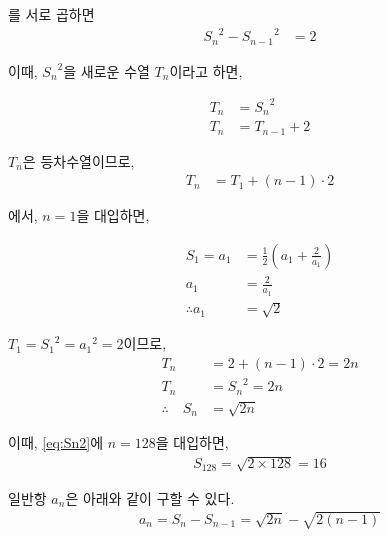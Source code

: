 \documentclass[a4paper,12pt]{article}
\begin{document}
를 서로 곱하면
\begin{align}
    {S_n}^2 - {S_{n-1}}^2 &= 2 \label{eq:diff_square}
\end{align}

\newpage
이때, ${S_n}^2$을 새로운 수열 ${T_n}$이라고 하면,

\begin{align}
    T_n &= {S_n}^2 \nonumber \\
    T_n &= T_{n-1} + 2 \label{eq:Tn}
\end{align}

$T_n$은 등차수열이므로,
\begin{align}
    T_n &= T_1 + (n-1) \cdot 2 \label{eq:Tn2}
\end{align}


 에서, $n=1$을 대입하면,

\begin{align}
    S_1 = a_1 &= \frac{1}{2}\left(a_1 + \frac{2}{a_1}\right) \nonumber \\
        {a_1} &= \frac{2}{a_1} \nonumber \\
        \therefore a_1 &= \sqrt{2} \label{eq:a_1}
\end{align}

$T_1 = {S_1}^2 = {a_1}^2 = 2$이므로,
\begin{align}
    T_n &= 2 + (n-1) \cdot 2 = 2n \nonumber \\
    T_n &= {S_n}^2 = 2n \nonumber \\
    \therefore \quad S_n &= \sqrt{2n} \label{eq:Sn2}
\end{align}


이때, \cref{eq:Sn2}에 $n=128$을 대입하면,
\begin{align*}
    S_{128} = \sqrt{2\times 128} =16
\end{align*}

일반항 $a_n$은 아래와 같이 구할 수 있다.
\begin{align*}
    a_n = S_n - S_{n-1} = \sqrt{2n} - \sqrt{2(n-1)}
\end{align*}
\end{document}
